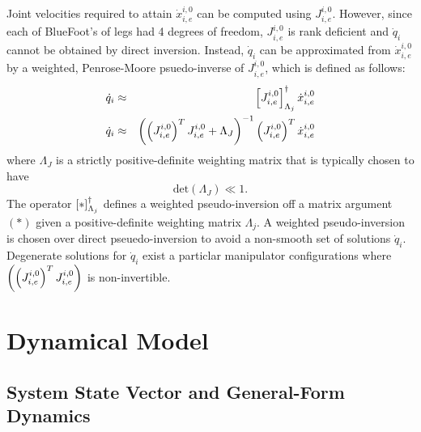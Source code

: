 			Joint velocities required to attain $\dot{x}^{i,0}_{i,e}$ can be computed using $J^{i,0}_{i,e}$. However, since each of BlueFoot's of legs had 4 degrees of freedom, $J^{i,0}_{i,e}$ is rank deficient and $\dot{q}_{i}$ cannot be obtained by direct inversion. Instead, $\dot{q}_{i}$ can be approximated from $\dot{x}^{i,0}_{i,e}$ by a weighted, Penrose-Moore psuedo-inverse of $J^{i,0}_{i,e}$, which is defined as follows:
				\begin{eqnarray}
					\dot{q}_{i} &\approx& \left[J^{i,0}_{i,e}\right]_{\Lambda_{j}}^{\dagger} \dot{x}^{i,0}_{i,e} \nonumber \\
					\dot{q}_{i} &\approx& \left( \left(J^{i,0}_{i,e}\right)^{T}J^{i,0}_{i,e} + \Lambda_{J} \right)^{-1} \left(J^{i,0}_{i,e}\right)^{T}\dot{x}^{i,0}_{i,e}
				\end{eqnarray}
			where $\Lambda_{J}$ is a strictly positive-definite weighting matrix that is typically chosen to have 
				\begin{equation*}
					\text{det}(\Lambda_{J}) \ll 1.
				\end{equation*}
			The operator $\left[*\right]_{\Lambda_{j}}^{\dagger}$ defines a weighted pseudo-inversion off a matrix argument $(*)$ given a positive-definite weighting matrix $\Lambda_{j}$. A weighted pseudo-inversion is chosen over direct pseuedo-inversion to avoid a non-smooth set of solutions $\dot{q}_{i}$. Degenerate solutions for $\dot{q}_{i}$ exist a particlar manipulator configurations where $\left(\left(J^{i,0}_{i,e}\right)^{T}J^{i,0}_{i,e}\right)$ is non-invertible.




	\section{Dynamical Model}
	

		\subsection{System State Vector and General-Form Dynamics}
		
